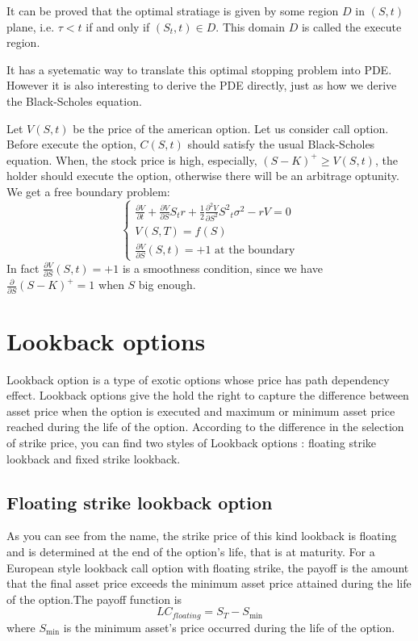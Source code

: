 \documentclass[12pt,oneside,titlepage]{book}
\begin{document}
It can be proved that the optimal stratiage is
given by some region $D$ in $(S,t)$ 
plane, i.e. $\tau<t$ if and only if $(S_t,t)\in D$. This domain $D$ is called
the execute region. 

It has a syetematic way to translate this optimal stopping problem into PDE. 
However it is also interesting to derive the PDE directly, just as how we 
derive the Black-Scholes equation.

Let $V(S,t)$ be the price of the american option. 
Let us consider call option. Before execute the option, $C(S,t)$ should 
satisfy the usual Black-Scholes equation. When, the stock price is high,
especially, $(S-K)^+\geq V(S,t)$, the holder should execute the option, 
otherwise there will be an arbitrage optunity.
We get a free boundary problem:
\[
\begin{cases}
\frac{\partial V}{\partial t} + \frac{\partial V }{\partial S} S_t r + \frac{1}{2} \frac{{\partial}^2 V}{\partial S^2} {S^2}_t {\sigma}^2 -rV=0\\
V(S, T) = f(S)\\
\frac{\partial V}{\partial S}(S,t) = +1 \text{ at the boundary} 
\end{cases}
\]
In fact $\frac{\partial V}{\partial S}(S,t) = +1$ is a smoothness condition, 
since we have $\frac{\partial}{\partial S}(S-K)^+ = 1$ when $S$ big enough.  

\section{Lookback options}

Lookback option is a type of exotic options whose price has path dependency effect. 
Lookback options give the hold the right to capture the difference between asset price when the option is executed and maximum or minimum asset price reached during the life of the option.  According to the difference in the selection of strike price, you can find two styles of Lookback options : floating strike lookback and fixed strike lookback.

\subsection{Floating strike lookback option}
As you can see from the name, the strike price of this kind lookback is floating and is determined at the end of the option's life, that is at maturity. For a European style lookback call option with floating strike, the payoff is the amount that the final asset price exceeds the minimum asset price attained during the life of the option.The payoff function is 
\begin{equation}
LC_{floating} = S_T - S_{\min}
\end{equation}
where $S_{\min}$ is the minimum asset's price occurred during the life of the option.
\end{document}
